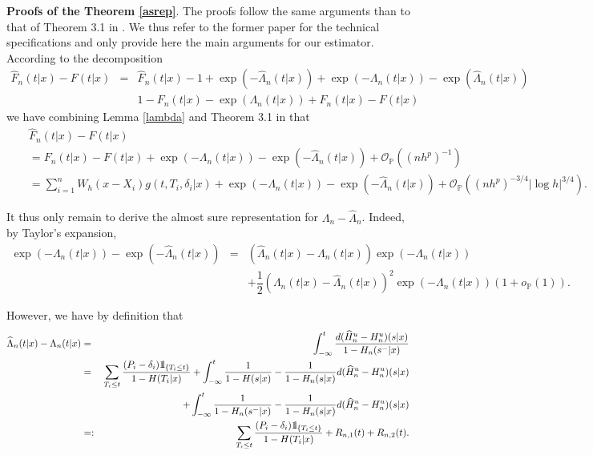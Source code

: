 \documentclass[12pt]{article}
\def\ind{ {{\rm 1}\hskip-2.2pt{\rm l}}}
\begin{document}
\noindent
\textbf{Proofs of the Theorem \ref{asrep}}. The proofs follow the same arguments than to that of Theorem 3.1 in \cite{Escobar2019}. We thus refer to the former paper for the technical specifications and only provide here the main arguments for our estimator. According to the decomposition
\begin{eqnarray*}
\widehat{F}_n(t|x)-F(t|x)&=&\widehat{F}_n(t|x)-1+\exp(-\widehat{\Lambda}_n(t|x))+\exp(-\Lambda_n(t|x))-\exp(\widehat{\Lambda}_n(t|x))\\
&&1-F_n(t|x)-\exp(\Lambda_n(t|x))+F_n(t|x)-F(t|x)
\end{eqnarray*} 
we have combining Lemma \ref{lambda} and Theorem 3.1 in \cite{Escobar2019} that
\begin{eqnarray*}
&&\widehat{F}_n(t|x)-F(t|x)\\
&&=F_n(t|x)-F(t|x)+\exp(-\Lambda_n(t|x))-\exp(-\widehat{\Lambda}_n(t|x))+\mathcal{O}_\mathbb{P}((nh^p)^{-1})\\
&&=\sum_{i=1}^nW_h(x-X_i)g(t,T_i,\delta_i|x)+\exp(-\Lambda_n(t|x))-\exp(-\widehat{\Lambda}_n(t|x))+\mathcal{O}_\mathbb{P}((nh^p)^{-3/4} |\log h|^{3/4}).
\end{eqnarray*}

It thus only remain to derive the almost sure representation for $\Lambda_n-\widehat{\Lambda}_n$. Indeed, by Taylor's expansion, 
\begin{eqnarray*}
\exp(-\Lambda_n(t|x))-\exp(-\widehat{\Lambda}_n(t|x))&=&(\widehat{\Lambda}_n(t|x)-\Lambda_n(t|x))\exp(-\Lambda_n(t|x))\\
&&+\dfrac{1}{2}(\Lambda_n(t|x)-\widehat{\Lambda}_n(t|x))^2\exp(-\Lambda_n(t|x))(1+o_\mathbb{P}(1)).
\end{eqnarray*}

However, we have by definition that
\begin{eqnarray*}
\widehat{\Lambda}_n(t|x)-\Lambda_n(t|x)&=&\int_{-\infty}^t\dfrac{d(\widehat{H}_n^u-H^u_n)(s|x)}{1-H_n(s^-|x)}\\
&=&\sum_{T_i\leq t}\dfrac{(P_i-\delta_i)\ind_{\{T_i\leq t\}}}{1-H(T_i|x)}+\int_{-\infty}^t\dfrac{1}{1-H(s|x)}-\dfrac{1}{1-H_n(s|x)}d(\widehat{H}_n^u-H^u_n)(s|x)\\
&&+\int_{-\infty}^t\dfrac{1}{1-H_n(s^-|x)}-\dfrac{1}{1-H_n(s|x)}d(\widehat{H}_n^u-H^u_n)(s|x)\\
&=:&\sum_{T_i\leq t}\dfrac{(P_i-\delta_i)\ind_{\{T_i\leq t\}}}{1-H(T_i|x)}+R_{n,1}(t)+R_{n,2}(t).
\end{eqnarray*}
\end{document}
